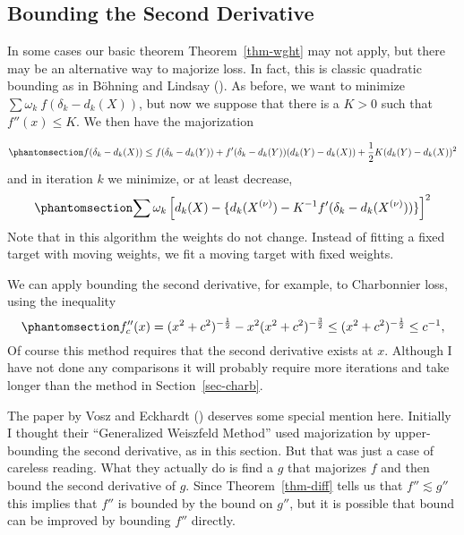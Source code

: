 \documentclass[
  12pt,
  letterpaper,
  DIV=11,
  numbers=noendperiod]{scrartcl}
\theoremstyle{definition}
\theoremstyle{definition}
\theoremstyle{plain}
\theoremstyle{plain}
\theoremstyle{plain}
\theoremstyle{remark}
\begin{document}
\subsection{Bounding the Second Derivative}\label{sec-bsec}

In some cases our basic theorem Theorem~\ref{thm-wght} may not apply,
but there may be an alternative way to majorize loss. In fact, this is
classic quadratic bounding as in Böhning and Lindsay
(). As before, we want to
minimize \(\sum \omega_k\ f(\delta_k-d_k(X))\), but now we suppose that
there is a \(K>0\) such that \(f''(x)\leq K\). We then have the
majorization

\begin{equation}\phantomsection\label{eq-qbound}{
f(\delta_k-d_k(X))\leq f(\delta_k-d_k(Y))+f'(\delta_k-d_k(Y))(d_k(Y)-d_k(X))+\frac12K(d_k(Y)-d_k(X))^2
}\end{equation} and in iteration \(k\) we minimize, or at least
decrease, \begin{equation}\phantomsection\label{eq-qiter}{
\sum \omega_k\left[d_k(X)-\{d_k(X^{(\nu)})-K^{-1}f'(\delta_k-d_k(X^{(\nu)}))\}\right]^2
}\end{equation} Note that in this algorithm the weights do not change.
Instead of fitting a fixed target with moving weights, we fit a moving
target with fixed weights.

We can apply bounding the second derivative, for example, to Charbonnier
loss, using the inequality
\begin{equation}\phantomsection\label{eq-chark}{
f_c''(x)=(x^2 + c^2)^{-\frac12}-x^2(x^2 + c^2)^{-\frac32}\leq(x^2 + c^2)^{-\frac12}\leq c^{-1},
}\end{equation} Of course this method requires that the second
derivative exists at \(x\). Although I have not done any comparisons it
will probably require more iterations and take longer than the method in
Section~\ref{sec-charb}.

The paper by Vosz and Eckhardt ()
deserves some special mention here. Initially I thought their
``Generalized Weiszfeld Method'' used majorization by upper-bounding the
second derivative, as in this section. But that was just a case of
careless reading. What they actually do is find a \(g\) that majorizes
\(f\) and then bound the second derivative of \(g\). Since
Theorem~\ref{thm-diff} tells us that \(f''\lesssim g''\) this implies
that \(f''\) is bounded by the bound on \(g''\), but it is possible that
bound can be improved by bounding \(f''\) directly.
\end{document}
